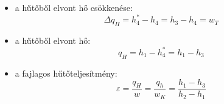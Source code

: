 \begin{itemize}
	\item a hűtőből elvont hő csökkenése:\begin{equation*}
		\Delta q_H=h_4^*-h_4=h_3-h_4=w_T
	\end{equation*}
	\item a hűtőből elvont hő:\begin{equation*}
		q_H=h_1-h_4^*=h_1-h_3
	\end{equation*}
	\item a fajlagos hűtőteljesítmény:\begin{equation*}
		\varepsilon= \dfrac{q_{H}}{w}=\dfrac{q_h}{w_K}=\dfrac{h_1-h_3}{h_2-h_1}
	\end{equation*}
\end{itemize}


\pagebreak